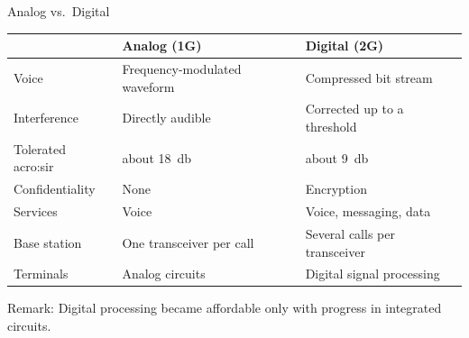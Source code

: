 \begin{frame}{Analog vs.\ Digital}
  \centering
  \begin{tabular}{lll}
    \toprule
    & \textbf{Analog (1G)} & \textbf{Digital (2G)} \\
    \midrule
    Voice & Frequency-modulated waveform & Compressed bit stream \\
    Interference & Directly audible & Corrected up to a threshold \\
    Tolerated \gls{acro:sir} & about \qty{18}{\decibel} & about \qty{9}{\decibel} \\
    Confidentiality & None & Encryption \\
    Services & Voice & Voice, messaging, data \\
    Base station & One transceiver per call & Several calls per transceiver \\
    Terminals & Analog circuits & Digital signal processing \\
    \bottomrule
  \end{tabular}

  \vspace{1em}
  \raggedright
  \alert{Remark:} Digital processing became affordable only with progress in integrated circuits.
\end{frame}

